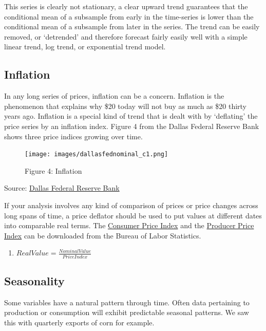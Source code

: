 \documentclass[
]{book}
\providecommand{\tightlist}{%
  \setlength{\itemsep}{0pt}\setlength{\parskip}{0pt}}
\begin{document}
This series is clearly not stationary, a clear upward trend guarantees that the conditional mean of a subsample from early in the time-series is lower than the conditional mean of a subsample from later in the series. The trend can be easily removed, or `detrended' and therefore forecast fairly easily well with a simple linear trend, log trend, or exponential trend model.

\hypertarget{inflation}{%
\subsection{Inflation}\label{inflation}}

In any long series of prices, inflation can be a concern. Inflation is the phenomenon that explains why \$20 today will not buy as much as \$20 thirty years ago. Inflation is a special kind of trend that is dealt with by `deflating' the price series by an inflation index. Figure 4 from the Dallas Federal Reserve Bank shows three price indices growing over time.

\begin{figure}
\centering
\texttt{[image: images/dallasfednominal\_c1.png]}
\caption{Figure 4: Inflation}
\end{figure}

Source: \href{http://www.dallasfed.org/research/basics/nominal.cfm}{Dallas Federal Reserve Bank}

If your analysis involves any kind of comparison of prices or price changes across long spans of time, a price deflator should be used to put values at different dates into comparable real terms. The \href{http://www.bls.gov/cpi/data.htm}{Consumer Price Index} and the \href{http://www.bls.gov/ppi/data.htm}{Producer Price Index} can be downloaded from the Bureau of Labor Statistics.

\begin{enumerate}
\def\labelenumi{(\arabic{enumi})}
\setcounter{enumi}{1}
\tightlist
\item
  \(Real Value = \frac{Nominal Value}{Price Index}\)
\end{enumerate}

\hypertarget{seasonality}{%
\subsection{Seasonality}\label{seasonality}}

Some variables have a natural pattern through time. Often data pertaining to production or consumption will exhibit predictable seasonal patterns. We saw this with quarterly exports of corn for example.
\end{document}
